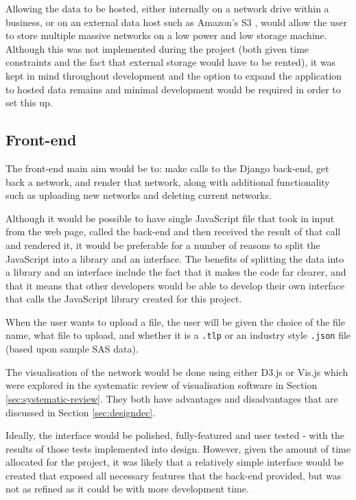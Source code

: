 \documentclass[../dissertation.tex]{subfiles}
\begin{document}
Allowing the data to be hosted, either internally on a network drive within a business, or on an external data host such as Amazon's S3 \cite{amazons3}, would allow the user to store multiple massive networks on a low power and low storage machine. Although this was not implemented during the project (both given time constraints and the fact that external storage would have to be rented), it was kept in mind throughout development and the option to expand the application to hosted data remains and minimal development would be required in order to set this up.

\subsection{Front-end}

The front-end main aim would be to: make calls to the Django back-end, get back a network, and render that network, along with additional functionality such as uploading new networks and deleting current networks. 

Although it would be possible to have single JavaScript file that took in input from the web page, called the back-end and then received the result of that call and rendered it, it would be preferable for a number of reasons to split the JavaScript into a library and an interface. The benefits of splitting the data into a library and an interface include the fact that it makes the code far clearer, and that it means that other developers would be able to develop their own interface that calls the JavaScript library created for this project.

When the user wants to upload a file, the user will be given the choice of the file name, what file to upload, and whether it is a \texttt{.tlp} or an industry style \texttt{.json} file (based upon sample SAS data).

The visualisation of the network would be done using either D3.js or Vis.js which were explored in the systematic review of visualisation software in Section \ref{sec:systematic-review}. They both have advantages and disadvantages that are discussed in Section \ref{sec:designdec}. 

Ideally, the interface would be polished, fully-featured and user tested - with the results of those tests implemented into design. However, given the amount of time allocated for the project, it was likely that a relatively simple interface would be created that exposed all necessary features that the back-end provided, but was not as refined as it could be with more development time.
\end{document}
